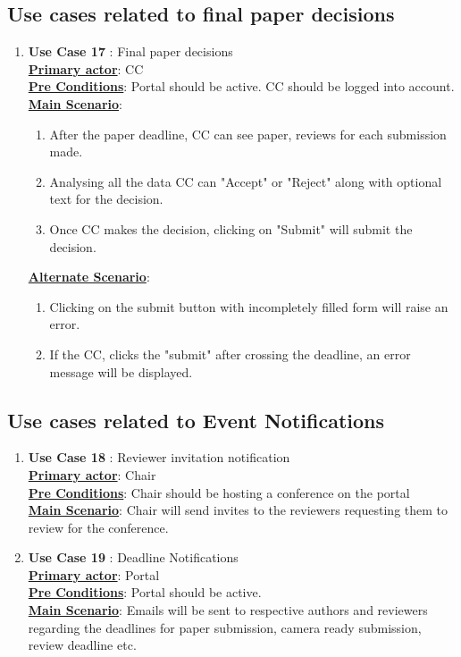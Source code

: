 \documentclass[english,a4paper,12pt]{report}
\begin{document}
\begin{enumerate}
\subsection{Use cases related to final paper decisions}
\begin{enumerate}

\item \textbf{Use Case 17 }: Final paper decisions\\
\underline{\textbf{Primary actor}}: CC\\
\underline{\textbf{Pre Conditions}}: Portal should be active. CC should be logged into account.\\
\underline{\textbf{Main Scenario}}:
\begin{enumerate}
    \item After the paper deadline, CC can see paper, reviews for each submission made.
    \item Analysing all the data CC can "Accept" or "Reject" along with optional text for the decision.
    \item Once CC makes the decision, clicking on "Submit" will submit the decision.
\end{enumerate}
\underline{\textbf{Alternate Scenario}}:
\begin{enumerate}
    \item Clicking on the submit button with incompletely filled form will raise an error.
    \item If the CC, clicks the "submit" after crossing the deadline, an error message will be displayed.
\end{enumerate}


\end{enumerate}
\subsection{Use cases related to Event Notifications}
\begin{enumerate}

    \item \textbf{Use Case 18 }: Reviewer invitation notification \\
\underline{\textbf{Primary actor}}: Chair\\
\underline{\textbf{Pre Conditions}}: Chair should be hosting a conference on the portal\\ 
\underline{\textbf{Main Scenario}}: Chair will send invites to the reviewers requesting them to review for the conference.

    \item \textbf{Use Case 19 }: Deadline Notifications \\
\underline{\textbf{Primary actor}}: Portal\\
\underline{\textbf{Pre Conditions}}: Portal should be active.\\ 
\underline{\textbf{Main Scenario}}: Emails will be sent to respective authors and reviewers regarding the deadlines for paper submission, camera ready submission, review deadline etc.


\end{enumerate}
\end{enumerate}
\end{document}
